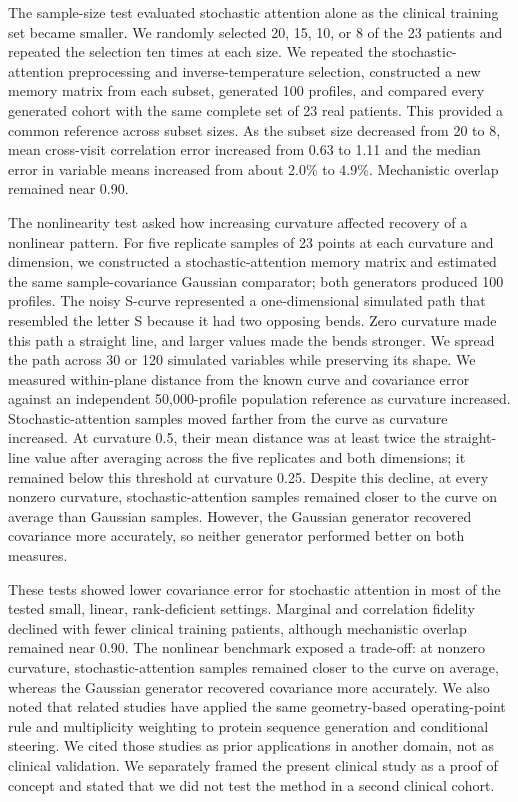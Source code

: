 \documentclass[
  11pt,
  letterpaper,
]{article}
\begin{document}
The sample-size test evaluated stochastic attention alone as the clinical training set became smaller. We randomly selected 20, 15, 10, or 8 of the 23 patients and repeated the selection ten times at each size. We repeated the stochastic-attention preprocessing and inverse-temperature selection, constructed a new memory matrix from each subset, generated 100 profiles, and compared every generated cohort with the same complete set of 23 real patients. This provided a common reference across subset sizes. As the subset size decreased from 20 to 8, mean cross-visit correlation error increased from 0.63 to 1.11 and the median error in variable means increased from about 2.0\% to 4.9\%. Mechanistic overlap remained near 0.90.

The nonlinearity test asked how increasing curvature affected recovery of a nonlinear pattern. For five replicate samples of 23 points at each curvature and dimension, we constructed a stochastic-attention memory matrix and estimated the same sample-covariance Gaussian comparator; both generators produced 100 profiles. The noisy S-curve represented a one-dimensional simulated path that resembled the letter S because it had two opposing bends. Zero curvature made this path a straight line, and larger values made the bends stronger. We spread the path across 30 or 120 simulated variables while preserving its shape. We measured within-plane distance from the known curve and covariance error against an independent 50,000-profile population reference as curvature increased. Stochastic-attention samples moved farther from the curve as curvature increased. At curvature 0.5, their mean distance was at least twice the straight-line value after averaging across the five replicates and both dimensions; it remained below this threshold at curvature 0.25. Despite this decline, at every nonzero curvature, stochastic-attention samples remained closer to the curve on average than Gaussian samples. However, the Gaussian generator recovered covariance more accurately, so neither generator performed better on both measures.

These tests showed lower covariance error for stochastic attention in most of the tested small, linear, rank-deficient settings. Marginal and correlation fidelity declined with fewer clinical training patients, although mechanistic overlap remained near 0.90. The nonlinear benchmark exposed a trade-off: at nonzero curvature, stochastic-attention samples remained closer to the curve on average, whereas the Gaussian generator recovered covariance more accurately. We also noted that related studies have applied the same geometry-based operating-point rule and multiplicity weighting to protein sequence generation and conditional steering. We cited those studies as prior applications in another domain, not as clinical validation. We separately framed the present clinical study as a proof of concept and stated that we did not test the method in a second clinical cohort.
\end{document}

